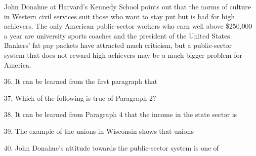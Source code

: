 \qquad John Donahue at Harvard's Kennedy School points out that the norms of culture in Western 
civil services suit those who want to stay put but is bad for high achievers. The only 
American public-sector workers who earn well above \$250,000 a year are university sports 
coaches and the president of the United States. Bankers' fat pay packets have attracted 
much criticism, but a public-sector system that does not reward high achievers may be a 
much bigger problem for America.

\vspace{6pt}

36. It can be learned from the first paragraph that\par

37. Which of the following is true of Paragraph 2?\par

38. It can be learned from Paragraph 4 that the income in the state sector is\par

39. The example of the unions in Wisconsin shows that unions\par

40. John Donahue's attitude towards the public-sector system is one of\par
